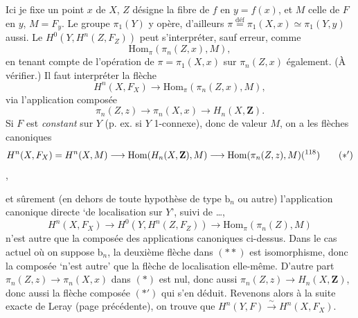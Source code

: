 \documentclass[11pt]{article}
\newcommand{\msp}[1]{\marginpar{\footnotesize [#1]}}
\begin{document}
Ici je fixe un point $x$ de $X$, $Z$ désigne la fibre de $f$ en $y=f(x)$, et $M$ celle de $F$ en $y$, $M=F_y$. Le groupe $\pi_1(Y)$ y opère, d’ailleurs $\pi \overset{\text{déf}}{=} \pi_1(X,x) \simeq \pi_1(Y,y)$ aussi. Le $H^0(Y,H^n(Z,F_Z))$ peut s’interpréter, sauf erreur, comme
\[
\mathrm{Hom}_\pi(\pi_n(Z,x),M),
\]
en tenant compte de l’opération de $\pi=\pi_1(X,x)$ sur $\pi_n(Z,x)$ également. (À vérifier.) Il faut interpréter la flèche
\[
H^n(X,F_X) \longrightarrow \mathrm{Hom}_\pi(\pi_n(Z,x),M),
\]
via l’application composée 
\[
\pi_n(Z,z) \longrightarrow \pi_n(X,x) \longrightarrow H_n(X,\mathbf{Z}). \tag*{$(*)$}
\]
Si $F$ est \textit{constant} sur $Y$ (p. ex. si $Y$ 1-connexe), donc de valeur $M$, on a les flèches canoniques
\[
H^n(X,F_X) = H^n(X,M) \longrightarrow \mathrm{Hom}(H_n(X,\mathbf{Z}),M) \longrightarrow \mathrm{Hom}(\pi_n(Z,z),M)\text{(\footnotemark[118])} \tag*{$(*')$}
\]
,

\msp{page 182}
et sûrement (en dehors de toute hypothèse de type $\mathrm{b}_n$ ou autre) l’application canonique directe ‘de localisation sur $Y$’, suivi de \dots,
\[
H^n(X,F_X) \longrightarrow H^0(Y,H^n(Z,F_Z)) \longrightarrow \mathrm{Hom}_\pi(\pi_n(Z),M) \tag*{$(**)$}
\]
n’est autre que la composée des applications canoniques ci-dessus. Dans le cas actuel où on suppose $\mathrm{b}_n$, la deuxième flèche dans $(**)$ est isomorphisme, donc la composée ‘n’est autre’ que la flèche de localisation elle-même. D’autre part $\pi_n(Z,z) \longrightarrow \pi_n(X,x)$ dans $(*)$ est nul, donc aussi $\pi_n(Z,z) \longrightarrow H_n(X,\mathbf{Z})$, donc aussi la flèche composée $(*')$ qui s’en déduit. Revenons alors à la suite exacte de Leray (page précédente), on trouve que $H^n(Y,F) \xrightarrow{\ \sim\ } H^n(X,F_X)$.
\end{document}
